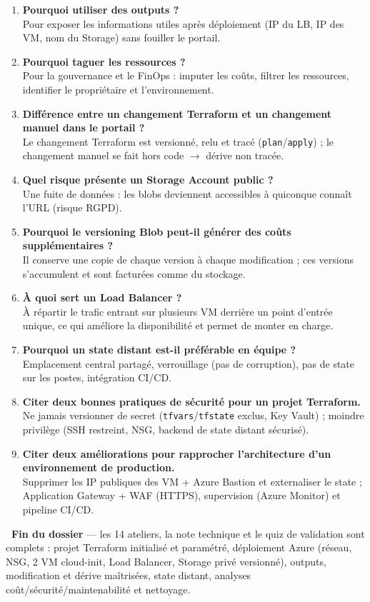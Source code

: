 \documentclass[11pt,a4paper]{article}
\newcommand{\emo}[1]{\raisebox{-0.14em}{\twemoji{#1}}}
\newcommand{\eParty}{\emo{1f389}}
\newcommand{\arr}{\ensuremath{\rightarrow}}
\newcommand{\code}[1]{\texttt{#1}}
\begin{document}
\begin{enumerate}[leftmargin=2.2em]
\item \textbf{Pourquoi utiliser des outputs ?}\\ Pour exposer les informations utiles après déploiement (IP du LB, IP des VM, nom du Storage) sans fouiller le portail.
\item \textbf{Pourquoi taguer les ressources ?}\\ Pour la gouvernance et le FinOps : imputer les coûts, filtrer les ressources, identifier le propriétaire et l'environnement.
\item \textbf{Différence entre un changement Terraform et un changement manuel dans le portail ?}\\ Le changement Terraform est versionné, relu et tracé (\code{plan}/\code{apply}) ; le changement manuel se fait hors code \arr{} dérive non tracée.
\item \textbf{Quel risque présente un Storage Account public ?}\\ Une fuite de données : les blobs deviennent accessibles à quiconque connaît l'URL (risque RGPD).
\item \textbf{Pourquoi le versioning Blob peut-il générer des coûts supplémentaires ?}\\ Il conserve une copie de chaque version à chaque modification ; ces versions s'accumulent et sont facturées comme du stockage.
\item \textbf{À quoi sert un Load Balancer ?}\\ À répartir le trafic entrant sur plusieurs VM derrière un point d'entrée unique, ce qui améliore la disponibilité et permet de monter en charge.
\item \textbf{Pourquoi un state distant est-il préférable en équipe ?}\\ Emplacement central partagé, verrouillage (pas de corruption), pas de state sur les postes, intégration CI/CD.
\item \textbf{Citer deux bonnes pratiques de sécurité pour un projet Terraform.}\\ Ne jamais versionner de secret (\code{tfvars}/\code{tfstate} exclus, Key Vault) ; moindre privilège (SSH restreint, NSG, backend de state distant sécurisé).
\item \textbf{Citer deux améliorations pour rapprocher l'architecture d'un environnement de production.}\\ Supprimer les IP publiques des VM + Azure Bastion et externaliser le state ; Application Gateway + WAF (HTTPS), supervision (Azure Monitor) et pipeline CI/CD.
\end{enumerate}

\vspace{6pt}
\begin{tcolorbox}[enhanced, sharp corners, boxrule=0pt, leftrule=4pt, colback=okgreenbg, colframe=okgreen,
   left=4.5mm,right=4.5mm,top=3.6mm,bottom=3.6mm]
{\sffamily\bfseries\color{okgreen}\eParty~Fin du dossier} — les 14 ateliers, la note technique et le quiz de
validation sont complets : projet Terraform initialisé et paramétré, déploiement Azure (réseau, NSG, 2 VM
cloud-init, Load Balancer, Storage privé versionné), outputs, modification et dérive maîtrisées, state distant,
analyses coût/sécurité/maintenabilité et nettoyage.
\end{tcolorbox}
\end{document}
